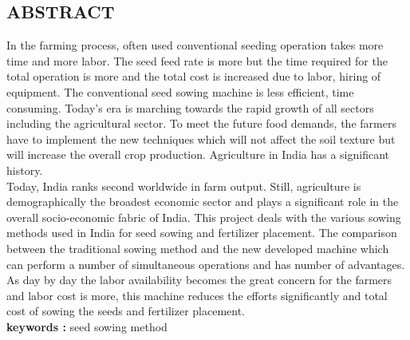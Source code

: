 \documentclass[12pt,a4paper]{article}
\numberwithin{figure}{section}
\numberwithin{table}{section}
\begin{document}




\newpage
{}
\begin{center}
 \section*{ABSTRACT}
\end{center}
In the farming process, often used conventional seeding operation takes more time and more
labor. The seed feed rate is more but the time required for the total operation is more and the total
cost is increased due to labor, hiring of equipment. The conventional seed sowing machine is less
efficient, time consuming. Today’s era is marching towards the rapid growth of all sectors
including the agricultural sector. To meet the future food demands, the farmers have to implement
the new techniques which will not affect the soil texture but will increase the overall crop
production. Agriculture in India has a significant history.\\
Today, India ranks second worldwide in farm output. Still, agriculture is demographically the
broadest economic sector and plays a significant role in the overall socio-economic fabric of India.
This project deals with the various sowing methods used in India for seed sowing and fertilizer
placement. The comparison between the traditional sowing method and the new developed
machine which can perform a number of simultaneous operations and has number of advantages.
As day by day the labor availability becomes the great concern for the farmers and labor cost is
more, this machine reduces the efforts significantly and total cost of sowing the seeds and fertilizer
placement.\\
\textbf{keywords :} seed sowing method 












\newpage
\pagestyle{empty}
\begin{center}
\tableofcontents 
\end{center}
\newpage
{\setlength{\baselineskip}{1\baselineskip}
\begin{center}	
\listoffigures				%
\end{center}		
}
\end{document}
